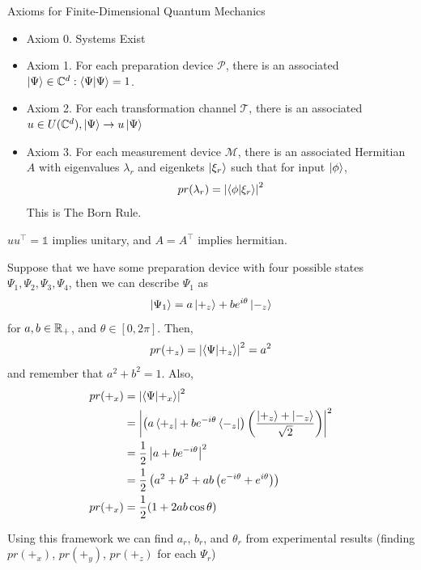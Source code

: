 \documentclass[english, 11pt]{article}
\begin{document}
      Axioms for Finite-Dimensional Quantum Mechanics

      \begin{itemize}
        \item Axiom 0. Systems Exist
        \item Axiom 1. For each preparation device $\mathcal{P}$, there is an associated $\ket{\Psi} \in \C^d : \braket{\Psi}{\Psi} = 1$.
        \item Axiom 2. For each transformation channel $\mathcal{T}$, there is an associated $u \in U({\mathbb{C}}^d), \left|\Psi\right\rangle \rightarrow u\left|\Psi\right\rangle$
        \item Axiom 3. For each measurement device $\mathcal{M}$, there is an associated Hermitian $A$ with eigenvalues $\lambda_r$ and eigenkets $\left|\xi_r\right\rangle$ such that for input $\left|\phi\right\rangle$,
        \[ pr(\lambda_r) = \left| \braket{\phi}{\xi_r}\right|^2 \]
        This is The Born Rule.
      \end{itemize}

      \begin{note}
        $uu^\intercal = \mathbb{1}$ implies unitary, and $A = A^\intercal$ implies hermitian.
      \end{note}

      \begin{exmp}
        Suppose that we have some preparation device with four possible states $\Psi_1, \Psi_2, \Psi_3, \Psi_4$, then we can describe $\Psi_1$ as
        \[ \left|\Psi_1\right\rangle = a\left|+_z\right\rangle + be^{i\theta}\left|-_z\right\rangle \]
        for $a, b \in {\mathbb{R}}_+$, and $\theta \in [0, 2\pi]$. Then,
        \[ pr(+_z) = \left|\braket{\Psi}{+_z}\right|^2 = a^2\]
        and remember that $a^2 + b^2 = 1$. Also,
        \begin{align*}
          pr(+_x) & = \left| \braket{\Psi}{+_x} \right|^2 \\
                  & = \left| \left( a \bra{+_z}+be^{-i\theta}\bra{-_z} \right) \left( \f{\ket{+_z} + \ket{-_z}}{\sqrt{2}} \right) \right|^2 \\
                  & = \f{1}{2} \left| a + be^{-i\theta} \right|^2 \\
                  & = \f{1}{2} \left( a^2 + b^2 + ab \left( e^{-i\theta} + e^{i\theta} \right) \right) \\
          pr(+_x) & = \f{1}{2} (1 + 2ab\cos\theta)
        \end{align*}

        Using this framework we can find $a_r$, $b_r$, and $\theta_r$ from experimental results (finding $pr(+_x)$, $pr(+_y)$, $pr(+_z)$ for each $\Psi_r$)
      \end{exmp}
\end{document}
